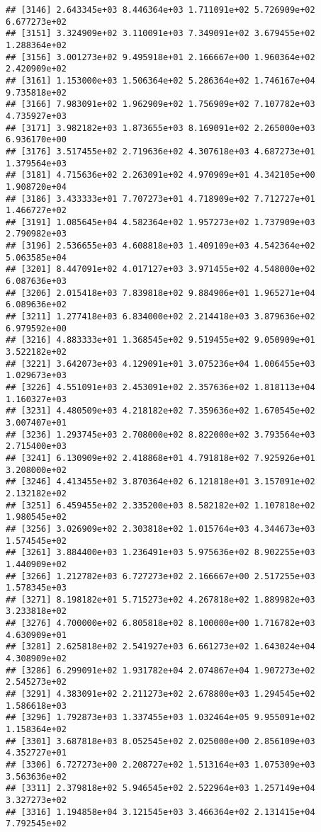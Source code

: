 \documentclass[]{article}
\begin{document}
\begin{verbatim}
## [3146] 2.643345e+03 8.446364e+03 1.711091e+02 5.726909e+02 6.677273e+02
## [3151] 3.324909e+02 3.110091e+03 7.349091e+02 3.679455e+02 1.288364e+02
## [3156] 3.001273e+02 9.495918e+01 2.166667e+00 1.960364e+02 2.420909e+02
## [3161] 1.153000e+03 1.506364e+02 5.286364e+02 1.746167e+04 9.735818e+02
## [3166] 7.983091e+02 1.962909e+02 1.756909e+02 7.107782e+03 4.735927e+03
## [3171] 3.982182e+03 1.873655e+03 8.169091e+02 2.265000e+03 6.936170e+00
## [3176] 3.517455e+02 2.719636e+02 4.307618e+03 4.687273e+01 1.379564e+03
## [3181] 4.715636e+02 2.263091e+02 4.970909e+01 4.342105e+00 1.908720e+04
## [3186] 3.433333e+01 7.707273e+01 4.718909e+02 7.712727e+01 1.466727e+02
## [3191] 1.085645e+04 4.582364e+02 1.957273e+02 1.737909e+03 2.790982e+03
## [3196] 2.536655e+03 4.608818e+03 1.409109e+03 4.542364e+02 5.063585e+04
## [3201] 8.447091e+02 4.017127e+03 3.971455e+02 4.548000e+02 6.087636e+03
## [3206] 2.015418e+03 7.839818e+02 9.884906e+01 1.965271e+04 6.089636e+02
## [3211] 1.277418e+03 6.834000e+02 2.214418e+03 3.879636e+02 6.979592e+00
## [3216] 4.883333e+01 1.368545e+02 9.519455e+02 9.050909e+01 3.522182e+02
## [3221] 3.642073e+03 4.129091e+01 3.075236e+04 1.006455e+03 1.029673e+03
## [3226] 4.551091e+03 2.453091e+02 2.357636e+02 1.818113e+04 1.160327e+03
## [3231] 4.480509e+03 4.218182e+02 7.359636e+02 1.670545e+02 3.007407e+01
## [3236] 1.293745e+03 2.708000e+02 8.822000e+02 3.793564e+03 2.715400e+03
## [3241] 6.130909e+02 2.418868e+01 4.791818e+02 7.925926e+01 3.208000e+02
## [3246] 4.413455e+02 3.870364e+02 6.121818e+01 3.157091e+02 2.132182e+02
## [3251] 6.459455e+02 2.335200e+03 8.582182e+02 1.107818e+02 1.980545e+02
## [3256] 3.026909e+02 2.303818e+02 1.015764e+03 4.344673e+03 1.574545e+02
## [3261] 3.884400e+03 1.236491e+03 5.975636e+02 8.902255e+03 1.440909e+02
## [3266] 1.212782e+03 6.727273e+02 2.166667e+00 2.517255e+03 1.578345e+03
## [3271] 8.198182e+01 5.715273e+02 4.267818e+02 1.889982e+03 3.233818e+02
## [3276] 4.700000e+02 6.805818e+02 8.100000e+00 1.716782e+03 4.630909e+01
## [3281] 2.625818e+02 2.541927e+03 6.661273e+02 1.643024e+04 4.308909e+02
## [3286] 6.299091e+02 1.931782e+04 2.074867e+04 1.907273e+02 2.545273e+02
## [3291] 4.383091e+02 2.211273e+02 2.678800e+03 1.294545e+02 1.586618e+03
## [3296] 1.792873e+03 1.337455e+03 1.032464e+05 9.955091e+02 1.158364e+02
## [3301] 3.687818e+03 8.052545e+02 2.025000e+00 2.856109e+03 4.352727e+01
## [3306] 6.727273e+00 2.208727e+02 1.513164e+03 1.075309e+03 3.563636e+02
## [3311] 2.379818e+02 5.946545e+02 2.522964e+03 1.257149e+04 3.327273e+02
## [3316] 1.194858e+04 3.121545e+03 3.466364e+02 2.131415e+04 7.792545e+02

\end{verbatim}
\end{document}
